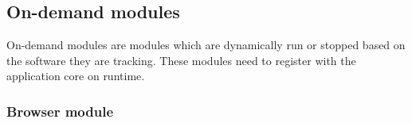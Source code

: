 \subsection{On-demand modules}
On-demand modules are modules which are dynamically run or stopped based on the software they are tracking. These modules need to register with the application core on runtime.
\subsubsection{Browser module}

\begin{specifications}
\end{specifications}
